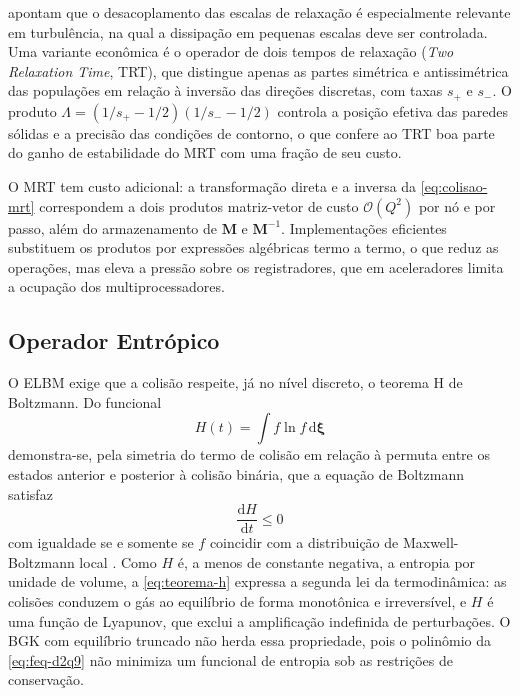 \textcite{Benzi1992} apontam que o desacoplamento das escalas de relaxação é especialmente relevante em turbulência, na qual a dissipação em pequenas escalas deve ser controlada.
Uma variante econômica é o operador de dois tempos de relaxação (\textit{Two Relaxation Time}, TRT), que distingue apenas as partes simétrica e antissimétrica das populações em relação à inversão das direções discretas, com taxas $s_+$ e $s_-$.
O produto $\Lambda = (1/s_+ - 1/2)(1/s_- - 1/2)$ controla a posição efetiva das paredes sólidas e a precisão das condições de contorno, o que confere ao TRT boa parte do ganho de estabilidade do MRT com uma fração de seu custo.

O MRT tem custo adicional: a transformação direta e a inversa da \eqref{eq:colisao-mrt} correspondem a dois produtos matriz-vetor de custo $\mathcal{O}(Q^2)$ por nó e por passo, além do armazenamento de $\mathbf{M}$ e $\mathbf{M}^{-1}$.
Implementações eficientes substituem os produtos por expressões algébricas termo a termo, o que reduz as operações, mas eleva a pressão sobre os registradores, que em aceleradores limita a ocupação dos multiprocessadores.


\subsection{Operador Entrópico}\label{subsec:lbm-elbm}

O ELBM exige que a colisão respeite, já no nível discreto, o teorema H de Boltzmann.
Do funcional
\begin{equation}\label{eq:funcional-h-continuo}
    H(t) = \int f \ln f \, \mathrm{d}\boldsymbol{\xi}
\end{equation}
demonstra-se, pela simetria do termo de colisão em relação à permuta entre os estados anterior e posterior à colisão binária, que a equação de Boltzmann satisfaz
\begin{equation}\label{eq:teorema-h}
    \frac{\mathrm{d}H}{\mathrm{d}t} \le 0
\end{equation}
com igualdade se e somente se $f$ coincidir com a distribuição de Maxwell-Boltzmann local \parencite{Chapman1970}.
Como $H$ é, a menos de constante negativa, a entropia por unidade de volume, a \eqref{eq:teorema-h} expressa a segunda lei da termodinâmica: as colisões conduzem o gás ao equilíbrio de forma monotônica e irreversível, e $H$ é uma função de Lyapunov, que exclui a amplificação indefinida de perturbações.
O BGK com equilíbrio truncado não herda essa propriedade, pois o polinômio da \eqref{eq:feq-d2q9} não minimiza um funcional de entropia sob as restrições de conservação.

